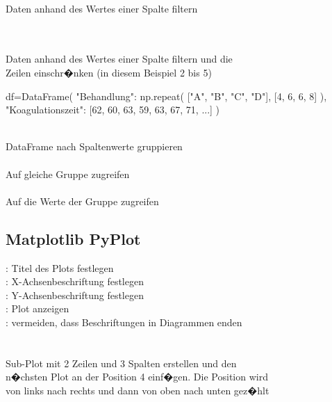 \documentclass{article}
\begin{document}
\begin{multicols*}{3}
 \\
Daten anhand des Wertes einer Spalte filtern

 \\
 \\
Daten anhand des Wertes einer Spalte filtern und die \\
Zeilen einschr�nken (in diesem Beispiel 2 bis 5)

\begin{tcolorbox}[boxrule=1pt,colback=black!4!white, title=\underline{\textbf{DataFrame f�r die n�chsten Befehle}},colframe=black!4!white,coltitle=black]
	\begin{python}
df=DataFrame({
  "Behandlung": np.repeat(
    ["A", "B", "C", "D"],
    [4, 6, 6, 8]
  ),
  "Koagulationszeit":
    [62, 60, 63, 59, 63, 67, 71, ...]
})
	\end{python}
\end{tcolorbox}

 \\
DataFrame nach Spaltenwerte gruppieren\\
 \\
Auf gleiche Gruppe zugreifen\\
\\
Auf die Werte der Gruppe zugreifen

\subsection*{Matplotlib PyPlot}
: Titel des Plots festlegen \\
: X-Achsenbeschriftung festlegen \\
: Y-Achsenbeschriftung festlegen \\
: Plot anzeigen \\
: vermeiden, dass Beschriftungen in Diagrammen enden \\

 \\
 \\
Sub-Plot mit 2 Zeilen und 3 Spalten erstellen und den \\ 
n�chsten Plot an der Position 4 einf�gen. Die Position wird \\
von links nach rechts und dann von oben nach unten gez�hlt


\end{multicols*}
\end{document}
